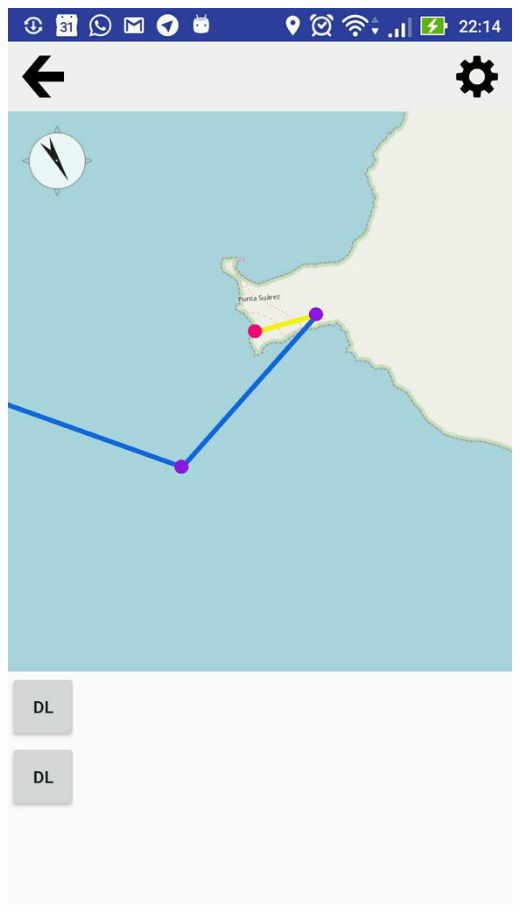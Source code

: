 \documentclass[xcolor=dvipsnames]{beamer}
\begin{document}
\begin{frame}
\begin{columns}
\begin{column}{0.5\textwidth}
		\includegraphics[width=\textwidth]{screenshots/vis-functional-2.jpg}
	\end{column}
	\end{columns}
\end{frame}
\end{document}
